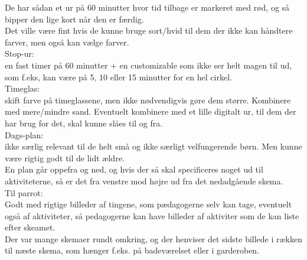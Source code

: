 De har sådan et ur på 60 minutter hvor tid tilbage er markeret med rød, og så bipper den lige kort når den er færdig.\\
  Det ville være fint hvis de kunne bruge sort/hvid til dem der ikke kan håndtere farver, men også kan vælge farver.\\

Stop-ur:\\
en fast timer på 60 minutter $+$ en customizable som ikke ser helt magen til ud, som f.eks, kan være på 5, 10 eller 15 minutter for en hel cirkel.\\

Timeglas:\\
skift farve på timeglassene, men ikke nødvendigvis gøre dem større. Kombinere med mere/mindre sand. Eventuelt kombinere med et lille digitalt ur, til dem der har brug for det, skal kunne slåes til og fra.\\

Dags-plan:\\
ikke særlig relevant til de helt små og ikke særligt velfungerende børn. Men kunne være rigtig godt til de lidt ældre.\\
   En plan går oppefra og ned, og hvis der så skal specificeres noget ud til aktiviteterne, så er det fra venstre mod højre ud fra det nedadgående skema.\\

Til parrot:\\
Godt med rigtige billeder af tingene, som pædagogerne selv kan tage, eventuelt også af aktiviteter, så pedagogerne kan have billeder af aktiviter som de kan liste efter skeamet.\\

Der var mange skemaer rundt omkring, og der henviser det sidste billede i rækken til næste skema, som hænger f.eks. på badeværelset eller i garderoben.